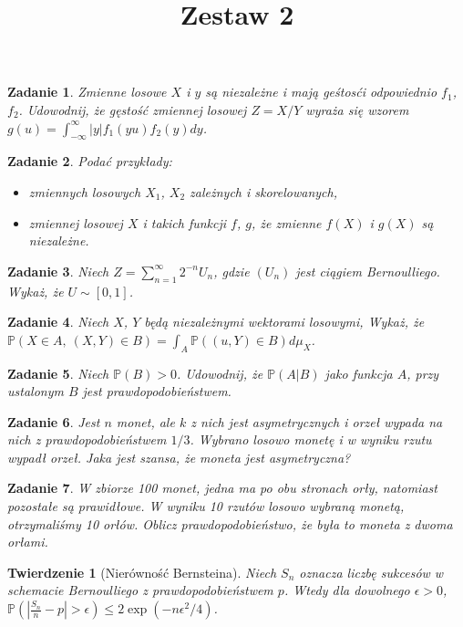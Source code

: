 \documentclass{mwart}
\title{Zestaw 2}
\newtheorem{tw}{Twierdzenie}
\newtheorem{zd}{Zadanie}
\begin{document}

\maketitle

\begin{zd}
Zmienne losowe $X$ i $y$ są niezależne i mają geśtosći odpowiednio $f_1$, $f_2$. Udowodnij, że gęstość zmiennej losowej $Z=X/Y$ wyraża się wzorem $g(u) = \int_{-\infty}^{\infty}|y|f_1(yu)f_2(y)dy$.
\end{zd}

\begin{zd}
Podać przykłady:
\begin{itemize}
\item zmiennych losowych $X_1$, $X_2$ zależnych i skorelowanych,
\item zmiennej losowej $X$ i takich funkcji $f$, $g$, że zmienne $f(X)$ i $g(X)$ są niezależne.
\end{itemize}
\end{zd}

\begin{zd}
Niech $Z=\sum_{n=1}^{\infty}2^{-n}U_n$, gdzie $(U_n)$ jest ciągiem Bernoulliego. Wykaż, że $U\sim [0, 1]$.
\end{zd}

\begin{zd}
Niech $X$, $Y$ będą niezależnymi wektorami losowymi, Wykaż, że $\mathbb{P}\left(X\in A,\ (X, Y)\in B\right) = \int_A\mathbb{P}\left((u, Y)\in B \right)d\mu_X$.
\end{zd}

\begin{zd}
Niech $\mathbb{P}(B) > 0$. Udowodnij, że $\mathbb{P}(A|B)$ jako funkcja $A$, przy ustalonym $B$ jest prawdopodobieństwem.
\end{zd}

\begin{zd}
Jest $n$ monet, ale $k$ z nich jest asymetrycznych i orzeł wypada na nich z prawdopodobieństwem $1/3$. Wybrano losowo monetę i w wyniku rzutu wypadł orzeł. Jaka jest szansa, że moneta jest asymetryczna?
\end{zd}

\begin{zd}
W zbiorze 100 monet, jedna ma po obu stronach orły, natomiast pozostałe są prawidłowe. W wyniku 10 rzutów losowo wybraną monetą, otrzymaliśmy 10 orłów. Oblicz prawdopodobieństwo, że była to moneta z dwoma orłami.
\end{zd}

\begin{tw} [Nierówność Bernsteina]
Niech $S_n$ oznacza liczbę sukcesów w schemacie Bernoulliego z prawdopodobieństwem $p$. Wtedy dla dowolnego $\epsilon > 0$, $\mathbb{P}\left(\left|\frac{S_n}{n} -p \right| > \epsilon\right) \leq 2\exp(-n\epsilon^2/4)$.
\end{tw}
\end{document}
